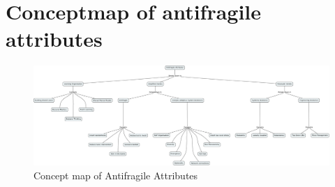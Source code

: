 \chapter{Conceptmap of antifragile attributes}
\label{app:cmapafattributes}

\begin{figure}
	\centering
	\includegraphics[width=0.9\linewidth]{images/cmapafattributes}
	\caption{Concept map of Antifragile Attributes}
	\label{fig:conceptmapafattributes}
\end{figure}